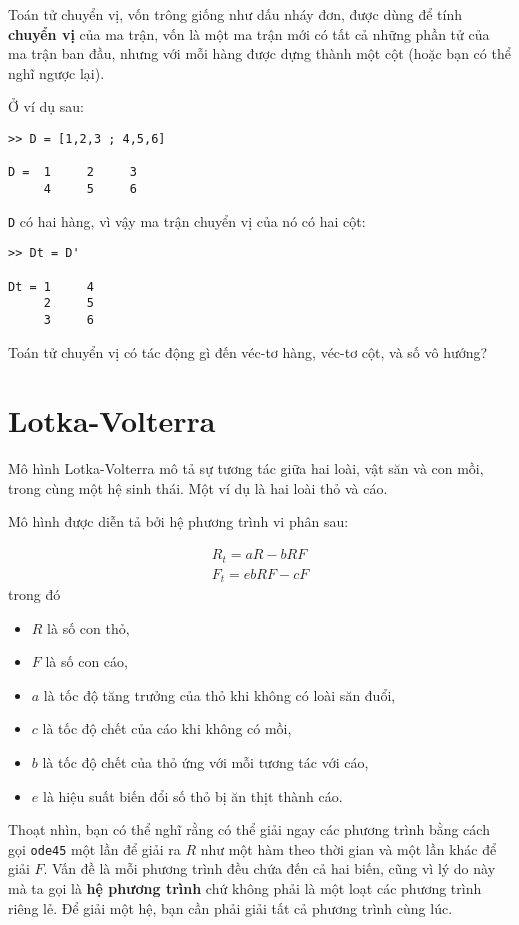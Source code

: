 \documentclass[12pt]{book}
\begin{document}
Toán tử chuyển vị, vốn trông giống như dấu nháy đơn, được dùng để
tính {\bf chuyển vị} của ma trận, vốn là một ma trận mới có tất cả
những phần tử của ma trận ban đầu, nhưng với mỗi hàng được
dựng thành một cột (hoặc bạn có thể nghĩ ngược lại).

Ở ví dụ sau:

\begin{verbatim}
>> D = [1,2,3 ; 4,5,6]

D =  1     2     3
     4     5     6
\end{verbatim}
%
{\tt D} có hai hàng, vì vậy ma trận chuyển vị của nó có
hai cột:

\begin{verbatim}
>> Dt = D'

Dt = 1     4
     2     5
     3     6
\end{verbatim}
%
\begin{ex}
Toán tử chuyển vị có tác động gì đến véc-tơ hàng, véc-tơ cột, và
số vô hướng?
\end{ex}


\section{Lotka-Volterra}
\label{lotka}

Mô hình Lotka-Volterra mô tả sự tương tác giữa hai loài, vật săn và con
mồi, trong cùng một hệ sinh thái. Một ví dụ là hai loài thỏ và cáo.

Mô hình được diễn tả bởi hệ phương trình vi phân sau:

\begin{eqnarray*}
R_t = a R - b R F \\
F_t = e b R F - c F
\end{eqnarray*}
%
trong đó
%
\begin{itemize}
%
\item $R$ là số con thỏ,
\item $F$ là số con cáo,
\item $a$ là tốc độ tăng trưởng của thỏ khi không có loài săn đuổi,
\item $c$ là tốc độ chết của cáo khi không có mồi,
\item $b$ là tốc độ chết của thỏ ứng với mỗi tương tác với cáo,
\item $e$ là hiệu suất biến đổi số thỏ bị ăn thịt thành cáo.
%
\end{itemize}

Thoạt nhìn, bạn có thể nghĩ rằng có thể giải ngay các phương trình
bằng cách gọi {\tt ode45} một lần để giải ra $R$ như một hàm theo
thời gian và một lần khác để giải $F$. Vấn đề là mỗi phương trình
đều chứa đến cả hai biến, cũng vì lý do này mà ta gọi là  
{\bf hệ phương trình} chứ không phải là một loạt các phương trình
riêng lẻ. Để giải một hệ, bạn cần phải giải tất cả phương trình
cùng lúc.
\end{document}
